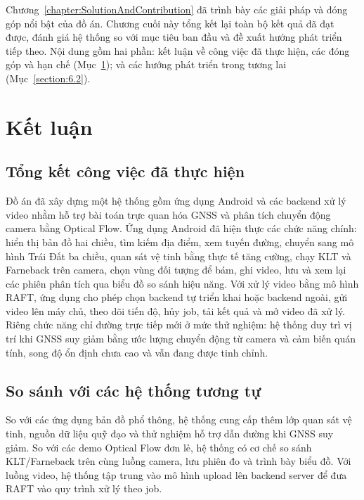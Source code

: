 \documentclass[../DoAn.tex]{subfiles}
\begin{document}
Chương~\ref{chapter:SolutionAndContribution} đã trình bày các giải pháp và đóng góp nổi bật của đồ án. Chương cuối này tổng kết lại toàn bộ kết quả đã đạt được, đánh giá hệ thống so với mục tiêu ban đầu và đề xuất hướng phát triển tiếp theo. Nội dung gồm hai phần: kết luận về công việc đã thực hiện, các đóng góp và hạn chế (Mục~\ref{section:6.1}); và các hướng phát triển trong tương lai (Mục~\ref{section:6.2}).

\section{Kết luận}
\label{section:6.1}
\subsection{Tổng kết công việc đã thực hiện}
\label{subsection:6.1.1}
Đồ án đã xây dựng một hệ thống gồm ứng dụng Android và các backend xử lý video nhằm hỗ trợ bài toán trực quan hóa GNSS và phân tích chuyển động camera bằng Optical Flow. Ứng dụng Android đã hiện thực các chức năng chính: hiển thị bản đồ hai chiều, tìm kiếm địa điểm, xem tuyến đường, chuyển sang mô hình Trái Đất ba chiều, quan sát vệ tinh bằng thực tế tăng cường, chạy KLT và Farneback trên camera, chọn vùng đối tượng để bám, ghi video, lưu và xem lại các phiên phân tích qua biểu đồ so sánh hiệu năng. Với xử lý video bằng mô hình RAFT, ứng dụng cho phép chọn backend tự triển khai hoặc backend ngoài, gửi video lên máy chủ, theo dõi tiến độ, hủy job, tải kết quả và mở video đã xử lý. Riêng chức năng chỉ đường trực tiếp mới ở mức thử nghiệm: hệ thống duy trì vị trí khi GNSS suy giảm bằng ước lượng chuyển động từ camera và cảm biến quán tính, song độ ổn định chưa cao và vẫn đang được tinh chỉnh.

\subsection{So sánh với các hệ thống tương tự}
\label{subsection:6.1.2}
So với các ứng dụng bản đồ phổ thông, hệ thống cung cấp thêm lớp quan sát vệ tinh, nguồn dữ liệu quỹ đạo và thử nghiệm hỗ trợ dẫn đường khi GNSS suy giảm. So với các demo Optical Flow đơn lẻ, hệ thống có cơ chế so sánh KLT/Farneback trên cùng luồng camera, lưu phiên đo và trình bày biểu đồ. Với luồng video, hệ thống tập trung vào mô hình upload lên backend server để đưa RAFT vào quy trình xử lý theo job.
\end{document}
